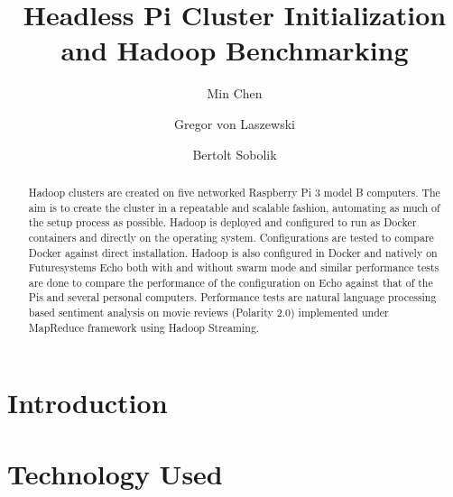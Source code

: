\title{Headless Pi Cluster Initialization and Hadoop Benchmarking}


\author{Min Chen}

\author{Gregor von Laszewski}

\author{Bertolt Sobolik}


\renewcommand{\shortauthors}{M. Chen, G. v. Laszewski, B. Sobolik}


\begin{abstract}
Hadoop clusters are created on five networked Raspberry Pi 3 model B
computers. The aim is to create the cluster in a repeatable and
scalable fashion, automating as much of the setup process as
possible. Hadoop is deployed and configured to run as Docker
containers and directly on the operating system. Configurations are
tested to compare Docker against direct installation. Hadoop is also
configured in Docker and natively on Futuresystems Echo both with and 
without swarm mode and similar performance tests are done to compare the 
performance of the configuration on Echo against that of the Pis and several 
personal computers. Performance tests are natural language processing 
based sentiment analysis on movie reviews (Polarity 2.0) implemented under 
MapReduce framework using Hadoop Streaming.
\end{abstract}



\maketitle

\section{Introduction}


\section{Technology Used}

